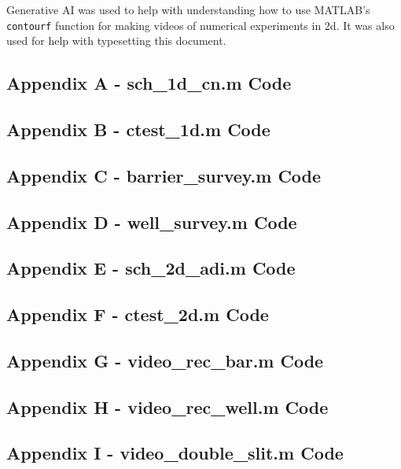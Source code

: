 \documentclass[10pt]{article}
\def\code#1{\texttt{#1}} %
\begin{document}
Generative AI was used to help with understanding how to use MATLAB's \code{contourf} function for 
making videos of numerical experiments in 2d. It was also used for help with typesetting this document.

\pagebreak


\subsection*{Appendix A - sch\_1d\_cn.m Code}

\pagebreak

\subsection*{Appendix B - ctest\_1d.m Code}

\pagebreak

\subsection*{Appendix C - barrier\_survey.m Code}

\pagebreak

\subsection*{Appendix D - well\_survey.m Code}

\pagebreak

\subsection*{Appendix E - sch\_2d\_adi.m Code}

\pagebreak

\subsection*{Appendix F - ctest\_2d.m Code}

\pagebreak

\subsection*{Appendix G - video\_rec\_bar.m Code}

\pagebreak

\subsection*{Appendix H - video\_rec\_well.m Code}

\pagebreak

\subsection*{Appendix I - video\_double\_slit.m Code}

\pagebreak
\end{document}
